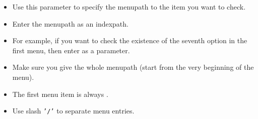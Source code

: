 \begin{itemize}
\item Use this parameter to specify the menupath to the item you want to check.
\item Enter the menupath as an indexpath.
\item For example, if you want to check the existence of the seventh option in the first menu, then enter  as a parameter.
\item Make sure you give the whole menupath (start from the very beginning of the menu).
\item The first menu item is always . 
\item Use slash {\tt '/'} to separate menu entries.
\end{itemize}
